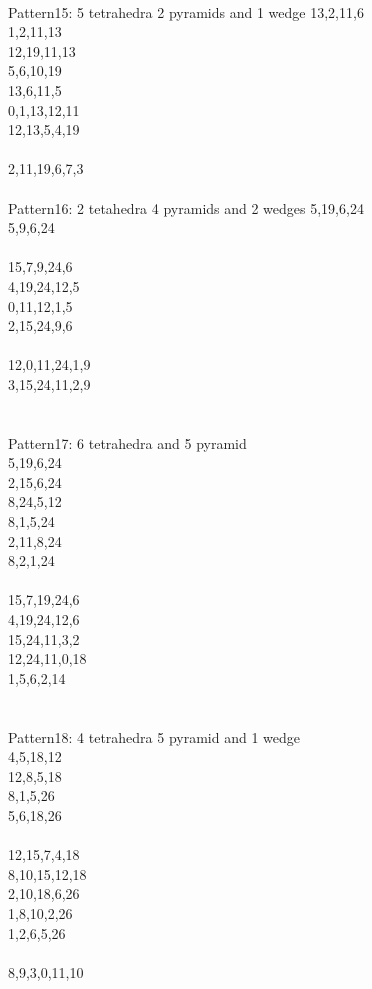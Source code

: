 \documentclass[twocolumn]{article}
\begin{document}
 \\
\tiny Pattern15: 5 tetrahedra 2 pyramids and 1 wedge
\tiny 13,2,11,6 \\
\tiny 1,2,11,13 \\
\tiny 12,19,11,13 \\
\tiny 5,6,10,19 \\
\tiny 13,6,11,5
\tiny   \\
\tiny 0,1,13,12,11 \\
\tiny 12,13,5,4,19 \\
\tiny   \\
\tiny 2,11,19,6,7,3 \\
%
%
 \\
\tiny Pattern16: 2 tetahedra 4 pyramids and 2 wedges
\tiny  5,19,6,24\\
\tiny  5,9,6,24\\
\tiny  \\
\tiny  15,7,9,24,6 \\
\tiny  4,19,24,12,5 \\
\tiny  0,11,12,1,5 \\
\tiny  2,15,24,9,6 \\
\tiny  \\
\tiny  12,0,11,24,1,9\\
\tiny  3,15,24,11,2,9\\
\tiny  \\

 \\
\tiny  Pattern17: 6 tetrahedra and 5 pyramid\\
\tiny  5,19,6,24 \\
\tiny  2,15,6,24 \\
\tiny  8,24,5,12 \\
\tiny  8,1,5,24 \\
\tiny  2,11,8,24\\
\tiny  8,2,1,24\\
\tiny  \\
\tiny  15,7,19,24,6\\
\tiny  4,19,24,12,6\\
\tiny  15,24,11,3,2 \\
\tiny  12,24,11,0,18 \\
\tiny  1,5,6,2,14 \\
\tiny  \\

 \\
\tiny  Pattern18: 4 tetrahedra 5 pyramid and 1 wedge\\
\tiny  4,5,18,12\\
\tiny  12,8,5,18 \\
\tiny  8,1,5,26 \\
\tiny  5,6,18,26 \\
\tiny   \\
\tiny  12,15,7,4,18 \\
\tiny  8,10,15,12,18 \\
\tiny  2,10,18,6,26 \\
\tiny  1,8,10,2,26\\
\tiny  1,2,6,5,26\\
\tiny   \\
\tiny  8,9,3,0,11,10 \\
    \\
\end{document}
